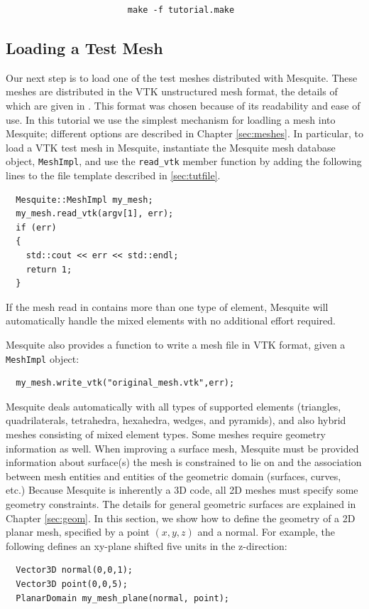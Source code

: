 \begin{verbatim}
                        make -f tutorial.make
\end{verbatim}


\subsection{Loading a Test Mesh}
\label{sec:tutMesh}
Our next step is to load one of the test meshes distributed with
Mesquite.  These meshes are distributed in the VTK unstructured mesh
format, the details of which are given in \cite{VTKbook, VTKuml}. This
format was chosen because of its readability and ease of use. 
In this tutorial we use
the simplest mechanism for loadling a mesh into Mesquite; different
options are described in Chapter \ref{sec:meshes}.  In particular, to
load a VTK test mesh in Mesquite, instantiate the Mesquite mesh
database object,
\texttt{MeshImpl}, and use the \texttt{read\_vtk} member function by
adding the following lines to the file template described in
\ref{sec:tutfile}.
\begin{verbatim}
  Mesquite::MeshImpl my_mesh;
  my_mesh.read_vtk(argv[1], err); 
  if (err) 
  {
    std::cout << err << std::endl;
    return 1;
  }
\end{verbatim}

If the mesh read in contains more than one type of element, Mesquite will automatically
handle the mixed elements with no additional effort required.

Mesquite also provides a function to write a mesh
file in VTK format, given a \texttt{MeshImpl} object:
\begin{verbatim}
  my_mesh.write_vtk("original_mesh.vtk",err); 
\end{verbatim}

Mesquite deals automatically with all types of supported elements 
(triangles, quadrilaterals, tetrahedra, hexahedra, wedges, and pyramids),
and also hybrid meshes consisting of mixed element types.  
Some meshes require geometry information as well.  When improving a surface mesh, Mesquite must be provided information
about surface(s) the mesh is constrained to lie on and the association between
mesh entities and entities of the geometric domain (surfaces, curves, etc.)
Because Mesquite is inherently a 3D code, all 2D meshes must specify some
geometry constraints.  The details
for general geometric surfaces are explained in Chapter 
\ref{sec:geom}. In this section,
we show how to define the geometry of a 2D planar mesh, specified by a
point $(x,y,z)$ and a normal. For example, the following defines an xy-plane
shifted five units in the z-direction:
\begin{verbatim}
  Vector3D normal(0,0,1);
  Vector3D point(0,0,5);
  PlanarDomain my_mesh_plane(normal, point);
\end{verbatim}


